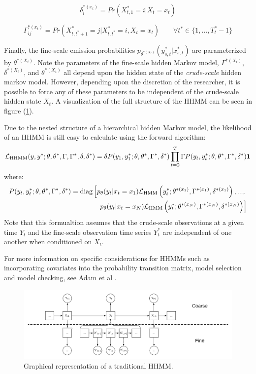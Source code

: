 $$\delta^{*(x_t)}_i = Pr(X^*_{t,1} = i | X_t = x_t)$$

$$\Gamma^{*(x_t)}_{ij} = Pr(X^*_{t,t^*+1} = j | X^*_{t,t^*} = i, X_t = x_t) \qquad \forall t^* \in \{ 1, \ldots, T^*_t-1\}$$

Finally, the fine-scale emission probabilities $p_{\theta^{*(X_t)}}(y^*_{s,t} | x^*_{s,t})$ are parameterized by $\theta^{*(X_t)}$. Note the parameters of the fine-scale hidden Markov model, $\Gamma^{*(X_t)}$, $\delta^{*(X_t)}$, and $\theta^{*(X_t)}$ all depend upon the hidden state of the \textit{crude-scale} hidden markov model. However, depending upon the discretion of the researcher, it is possible to force any of these parameters to be independent of the crude-scale hidden state $X_t$. A visualization of the full structure of the HHMM can be seen in figure (\ref{fig:HHMM}).

Due to the nested structure of a hierarchical hidden Markov model, the likelihood of an HHMM is still easy to calculate using the forward algorithm:
%
$$\mathcal{L}_{\text{HHMM}}(y,y^*;\theta,\theta^*,\Gamma,\Gamma^*,\delta,\delta^*) = \delta P(y_1,y_1^*;\theta,\theta^*,\Gamma^*,\delta^*) \prod_{t=2}^T \Gamma P(y_t,y_t^*;\theta,\theta^*,\Gamma^*,\delta^*) \mathbf{1}$$
%
where:
%
\begin{align*}
	P(y_t,y_t^*;\theta,\theta^*,\Gamma^*,\delta^*)  = \text{diag}\left[p_{\theta}(y_t|x_t = x_1)\mathcal{L}_{\text{HMM}}\left(y_t^*;\theta^{*(x_1)},\Gamma^{*(x_1)},\delta^{*(x_1)}\right), . . . , \right.\\
	\left. p_{\theta}(y_t|x_t = x_N )\mathcal{L}_{\text{HMM}}\left(y_t^*;\theta^{*(x_N)},\Gamma^{*(x_N)},\delta^{*(x_N)}\right) \right]
\end{align*}
%
Note that this formualtion assumes that the crude-scale observations at a given time $Y_t$ and the fine-scale observation time series $Y_t^*$ are independent of one another when conditioned on $X_t$.

For more information on specific considerations for HHMMs such as incorporating covariates into the probability transition matrix, model selection and model checking, see Adam et al \cite{Adam:2019}.

\begin{figure}[h!]
	\centering
	\includegraphics[width=6.5in]{../Plots/HHMM.png}
	\caption{Graphical representation of a traditional HHMM.}
	\label{fig:HHMM}
\end{figure}

